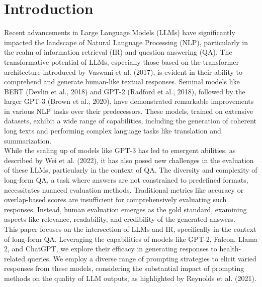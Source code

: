 \chapter{Introduction}\label{structure}



Recent advancements in Large Language Models (LLMs) have significantly impacted the landscape of Natural Language Processing (NLP), particularly in the realm of information retrieval (IR) and question answering (QA).
The transformative potential of LLMs, especially those based on the transformer architecture introduced by Vaswani et al. (2017), is evident in their ability to comprehend and generate human-like textual responses.
Seminal models like BERT (Devlin et al., 2018) and GPT-2 (Radford et al., 2018), followed by the larger GPT-3 (Brown et al., 2020), have demonstrated remarkable improvements in various NLP tasks over their predecessors.
These models, trained on extensive datasets, exhibit a wide range of capabilities, including the generation of coherent long texts and performing complex language tasks like translation and summarization.
\\
While the scaling up of models like GPT-3 has led to emergent abilities, as described by Wei et al. (2022), it has also posed new challenges in the evaluation of these LLMs, particularly in the context of QA.
The diversity and complexity of long-form QA, a task where answers are not constrained to predefined formats, necessitates nuanced evaluation methods.
Traditional metrics like accuracy or overlap-based scores are insufficient for comprehensively evaluating such responses.
Instead, human evaluation emerges as the gold standard, examining aspects like relevance, readability, and credibility of the generated answers.
\\
This paper focuses on the intersection of LLMs and IR, specifically in the context of long-form QA.
Leveraging the capabilities of models like GPT-2, Falcon, Llama 2, and ChatGPT, we explore their efficacy in generating responses to health-related queries.
We employ a diverse range of prompting strategies to elicit varied responses from these models, considering the substantial impact of prompting methods on the quality of LLM outputs, as highlighted by Reynolds et al. (2021).


